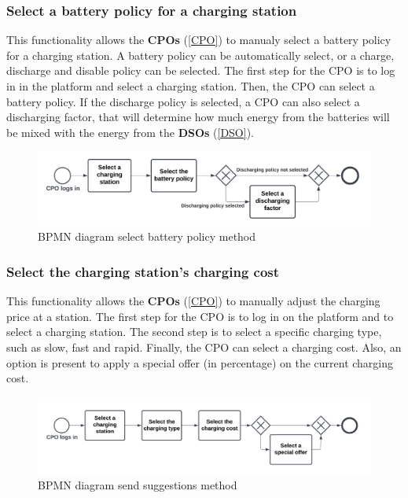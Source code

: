 \subsubsection{Select a battery policy for a charging station}
This functionality allows the \textbf{CPOs} (\ref{CPO}) to manualy select a battery policy for a charging station. A battery policy can be automatically select, or a charge, discharge and disable policy can be selected. The first step for the CPO is to log in in the platform and select a charging station. Then, the CPO can select a battery policy. If the discharge policy is selected, a CPO can also select a discharging factor, that will determine how much energy from the batteries will be mixed with the energy from the \textbf{DSOs} (\ref{DSO}).
\begin{figure}[H]
    \begin{center}
        \includegraphics[width=\textwidth]{img/fun-bat-pol.png}
        \caption{BPMN diagram select battery policy method}
    \end{center}
\end{figure}
\subsubsection{Select the charging station's charging cost}
This functionality allows the \textbf{CPOs} (\ref{CPO}) to manually adjust the charging price at a station. The first step for the CPO is to log in on the platform and to select a charging station. The second step is to select a specific charging type, such as slow, fast and rapid. Finally, the CPO can select a charging cost. Also, an option is present to apply a special offer (in percentage) on the current charging cost.
\begin{figure}[H]
    \begin{center}
        \includegraphics[width=\textwidth]{img/fun-char-cost.png}
        \caption{BPMN diagram send suggestions method}
    \end{center}
\end{figure}
%
